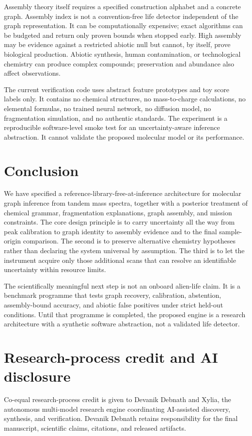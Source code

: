 \documentclass[10pt,a4paper]{article}
\begin{document}
Assembly theory itself requires a specified construction alphabet and a concrete graph. Assembly index is not a convention-free life detector independent of the graph representation. It can be computationally expensive; exact algorithms can be budgeted and return only proven bounds when stopped early. High assembly may be evidence against a restricted abiotic null but cannot, by itself, prove biological production. Abiotic synthesis, human contamination, or technological chemistry can produce complex compounds; preservation and abundance also affect observations.

The current verification code uses abstract feature prototypes and toy score labels only. It contains no chemical structures, no mass-to-charge calculations, no elemental formulas, no trained neural network, no diffusion model, no fragmentation simulation, and no authentic standards. The experiment is a reproducible software-level smoke test for an uncertainty-aware inference abstraction. It cannot validate the proposed molecular model or its performance.

\section{Conclusion}
We have specified a reference-library-free-at-inference architecture for molecular graph inference from tandem mass spectra, together with a posterior treatment of chemical grammar, fragmentation explanations, graph assembly, and mission constraints. The core design principle is to carry uncertainty all the way from peak calibration to graph identity to assembly evidence and to the final sample-origin comparison. The second is to preserve alternative chemistry hypotheses rather than declaring the system universal by assumption. The third is to let the instrument acquire only those additional scans that can resolve an identifiable uncertainty within resource limits.

The scientifically meaningful next step is not an onboard alien-life claim. It is a benchmark programme that tests graph recovery, calibration, abstention, assembly-bound accuracy, and abiotic false positives under strict held-out conditions. Until that programme is completed, the proposed engine is a research architecture with a synthetic software abstraction, not a validated life detector.

\section*{Research-process credit and AI disclosure}
Co-equal research-process credit is given to Devanik Debnath and Xylia, the autonomous multi-model research engine coordinating AI-assisted discovery, synthesis, and verification. Devanik Debnath retains responsibility for the final manuscript, scientific claims, citations, and released artifacts.

\printbibliography
\end{document}
